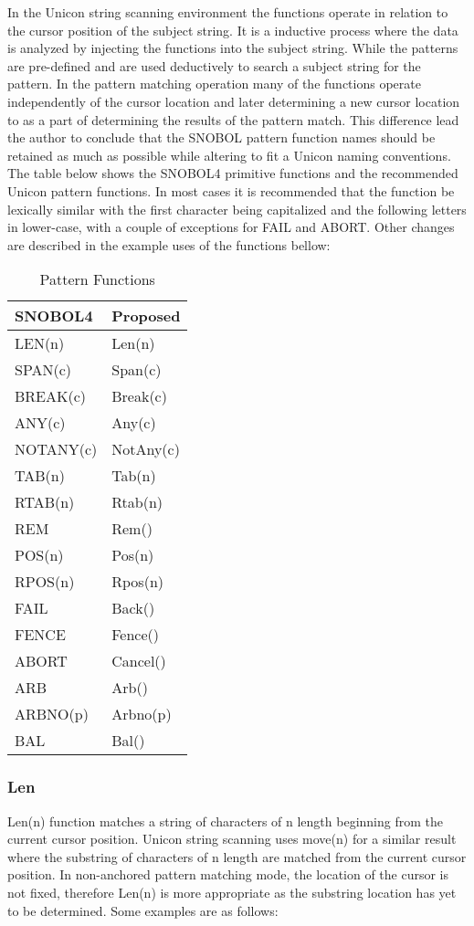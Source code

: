 \documentclass{article}
\begin{document}
In the Unicon string scanning environment the functions operate in relation to the cursor position of the subject string.  It is a inductive process where the data is analyzed by injecting the functions into the subject string.  While the patterns are pre-defined and are used deductively to search a subject string for the pattern.  In the pattern matching operation many of the functions operate independently of the cursor location and later determining a new cursor location to as a part of determining the results of the pattern match.  This difference lead the author to conclude that the SNOBOL pattern function names should be retained as much as possible while altering to fit a Unicon naming conventions.  The table below shows the SNOBOL4 primitive functions and the recommended Unicon pattern functions.  In most cases it is recommended that the function be lexically similar with the first character being capitalized and the following letters in lower-case, with a couple of exceptions for FAIL and ABORT.  Other changes are described in the example uses of the functions bellow: 

\begin{table}[ht]
	\caption{Pattern Functions}
	\centering
	\begin{tabular}{|l|l|}
		\hline\hline
		SNOBOL4 & Proposed \\
		\hline
		LEN(n) & Len(n) \\
		SPAN(c) & Span(c)  \\
		BREAK(c) & Break(c) \\
		ANY(c) & Any(c) \\
		NOTANY(c) & NotAny(c) \\
		TAB(n) & Tab(n) \\
		RTAB(n) & Rtab(n) \\
		REM & Rem() \\
		POS(n) & Pos(n)  \\
		RPOS(n) & Rpos(n)  \\
		FAIL & Back() \\
		FENCE & Fence() \\
		ABORT & Cancel() \\
		ARB & Arb() \\
		ARBNO(p) & Arbno(p) \\
		BAL & Bal() \\
		\hline
	\end{tabular}
\end{table}



\pagebreak
\subsubsection{Len}
Len(n) function matches a string of characters of n length beginning from the current cursor position.  Unicon string scanning uses move(n) for a similar result where the substring of characters of n length are matched from the current cursor position.  In non-anchored pattern matching mode, the location of the cursor is not fixed, therefore Len(n) is more appropriate as the substring location has yet to be determined.  Some examples are as follows: \\
\end{document}
